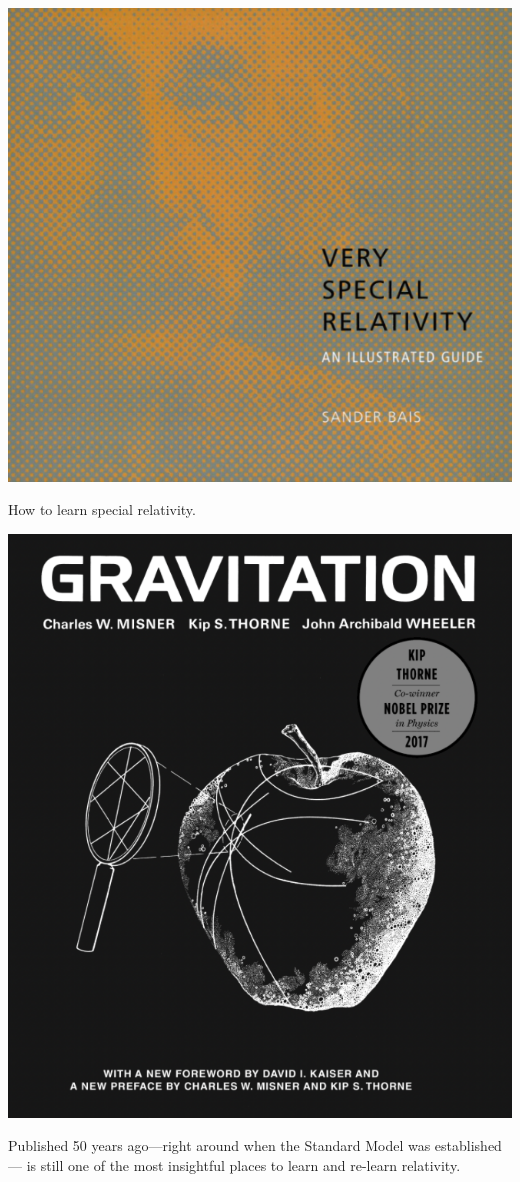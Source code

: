 \documentclass[12pt, oneside]{report}    %
\begin{document}
\begin{marginfigure}%
    \includegraphics[width=.8\textwidth]{figures/vsr_cover.png}
    \caption{How to learn special relativity.}
    \label{fig:VSR:cover}
\end{marginfigure}
\begin{marginfigure}%
    \includegraphics[width=.8\textwidth]{figures/MSW_cover.png}
    \caption{Published 50 years ago---right around when the Standard Model was established--- is still one of the most insightful places to learn and re-learn relativity. }
    \label{fig:MTW:cover}
\end{marginfigure}
\end{document}
